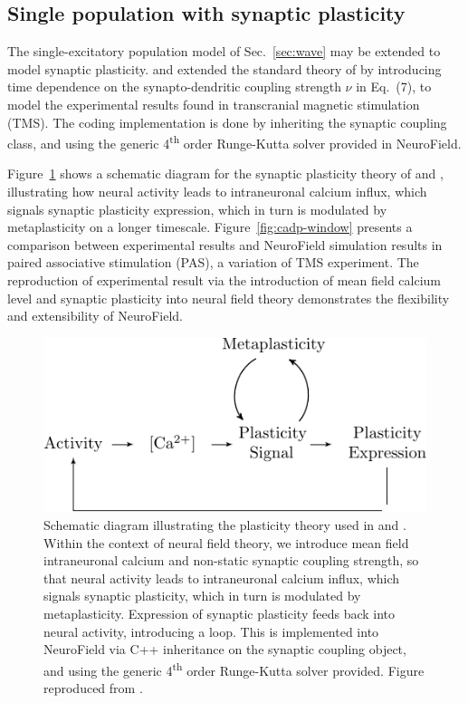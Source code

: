 \documentclass[preprint,review,10pt,authoryear,letterpaper]{elsarticle}
\begin{document}

\clearpage

\subsection{Single population with synaptic plasticity}
\label{sec:cadp}

The single-excitatory population model of Sec.~\ref{sec:wave} may be extended to model synaptic plasticity. \citet{fung13} and \citet{fung14} extended the standard theory of \citet{Robinson2005} by introducing time dependence on the synapto-dendritic coupling strength \(\nu\) in Eq.~(7), to model the experimental results found in transcranial magnetic stimulation (TMS). The coding implementation is done by inheriting the synaptic coupling class, and using the generic 4\textsuperscript{th} order Runge-Kutta solver provided in NeuroField.

Figure~\ref{fig:cadp} shows a schematic diagram for the synaptic plasticity theory of \citet{fung13} and \citet{fung14}, illustrating how neural activity leads to intraneuronal calcium influx, which signals synaptic plasticity expression, which in turn is modulated by metaplasticity on a longer timescale. Figure~\ref{fig:cadp-window} presents a comparison between experimental results and NeuroField simulation results in paired associative stimulation (PAS), a variation of TMS experiment. The reproduction of experimental result via the introduction of mean field calcium level and synaptic plasticity into neural field theory demonstrates the flexibility and extensibility of NeuroField.

\begin{figure}[t]
\begin{center}
\includegraphics[width=.7\textwidth]{bcm-schematic}
\caption{Schematic diagram illustrating the plasticity theory used in \citet{fung13} and \citet{fung14}. Within the context of neural field theory, we introduce mean field intraneuronal calcium and non-static synaptic coupling strength, so that neural activity leads to intraneuronal calcium influx, which signals synaptic plasticity, which in turn is modulated by metaplasticity. Expression of synaptic plasticity feeds back into neural activity, introducing a loop. This is implemented into NeuroField via C++ inheritance on the synaptic coupling object, and using the generic 4\textsuperscript{th} order Runge-Kutta solver provided. Figure reproduced from \citet{fung14}.}
\label{fig:cadp}
\end{center}
\end{figure}
\end{document}
